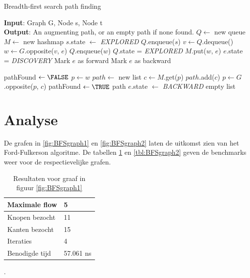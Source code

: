 \begin{algorithm}
 \caption{Breadth-first search path finding}
 \label{alg:breadthfirst}
 \begin{algorithmic}
  \REQUIRE \textbf{Input}: Graph G, Node s, Node t \\ 
\textbf{Output}: An augmenting path, or an empty path if none found.
  \STATE $Q \gets $ new queue
  \STATE $M \gets $ new hashmap
  \STATE $s$.state $\gets$ \textit{EXPLORED}
  \STATE $Q$.enqueue($s$)
   \STATE $v \gets Q$.dequeue()
    \STATE $w \gets G$.opposite($v$, $e$)
      \STATE $Q$.enqueue($w$)
      \STATE $Q$.state = \textit{EXPLORED}
      \STATE $M$.put($w$, $e$) 
      \STATE $e$.state = \textit{DISCOVERY}
         \STATE Mark $e$ as forward
      \ELSE
         \STATE Mark $e$ as backward
      \ENDIF

         \STATE pathFound $\gets \FALSE$
         \STATE $p \gets w$
         \STATE $path \gets $ new list
          \STATE $c \gets M$.get($p$) 
          \STATE $path$.add($c$)      
          \STATE $p \gets G$.opposite($p$, $c$) 
            \STATE pathFound $\gets \TRUE$ 
          \ENDIF
         \ENDWHILE
         \RETURN path
      \ENDIF
    \ENDIF
    \ELSE
      \STATE $e$.state $\gets$ \textit{BACKWARD}
    \ENDIF
   \ENDFOR
  \ENDWHILE
  \RETURN empty list 
 \end{algorithmic}
\end{algorithm}

\clearpage

\section{Analyse}
De grafen in \ref{fig:BFSgraph1} en \ref{fig:BFSgraph2} laten de uitkomst zien van het Ford-Fulkerson algoritme. De tabellen \ref{tbl:BFSgraph1} en \ref{tbl:BFSgraph2} geven de benchmarks weer voor de respectievelijke grafen.

\begin{table}[h]
 \begin{tabularx}{\linewidth}{| l | X |}
 \hline
 Maximale flow & 5 \\
 \hline
 Knopen bezocht & 11 \\
 \hline
 Kanten bezocht & 15 \\
 \hline
 Iteraties & 4 \\
 \hline
 Benodigde tijd & 57.061 ns \\
 \hline
\end{tabularx}
\centering
\caption{Resultaten voor graaf in figuur \ref{fig:BFSgraph1}}.
\label{tbl:BFSgraph1}
\end{table}

